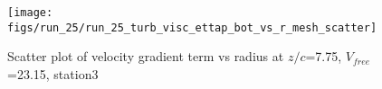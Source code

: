 \begin{figure}[H]
\centering
\texttt{[image: figs/run\_25/run\_25\_turb\_visc\_ettap\_bot\_vs\_r\_mesh\_scatter]}
\caption{Scatter plot of velocity gradient term vs radius at $z/c$=7.75, $V_{free}$=23.15, station3}
\label{fig:run_25_turb_visc_ettap_bot_vs_r_mesh_scatter}
\end{figure}



